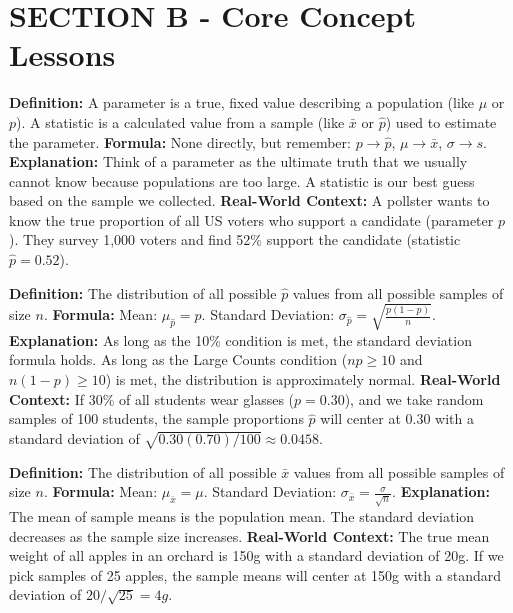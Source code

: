 \section{SECTION B - Core Concept Lessons}

\begin{lessonbox}
\textbf{Definition:} A parameter is a true, fixed value describing a population (like $\mu$ or $p$). A statistic is a calculated value from a sample (like $\bar{x}$ or $\hat{p}$) used to estimate the parameter.
\textbf{Formula:} None directly, but remember: $p \rightarrow \hat{p}$, $\mu \rightarrow \bar{x}$, $\sigma \rightarrow s$.
\textbf{Explanation:} Think of a parameter as the ultimate truth that we usually cannot know because populations are too large. A statistic is our best guess based on the sample we collected. 
\textbf{Real-World Context:} A pollster wants to know the true proportion of all US voters who support a candidate (parameter $p$). They survey 1,000 voters and find 52\% support the candidate (statistic $\hat{p} = 0.52$).
\end{lessonbox}

\begin{lessonbox}
\textbf{Definition:} The distribution of all possible $\hat{p}$ values from all possible samples of size $n$.
\textbf{Formula:} Mean: $\mu_{\hat{p}} = p$. Standard Deviation: $\sigma_{\hat{p}} = \sqrt{\frac{p(1-p)}{n}}$.
\textbf{Explanation:} As long as the 10\% condition is met, the standard deviation formula holds. As long as the Large Counts condition ($np \geq 10$ and $n(1-p) \geq 10$) is met, the distribution is approximately normal.
\textbf{Real-World Context:} If 30\% of all students wear glasses ($p=0.30$), and we take random samples of 100 students, the sample proportions $\hat{p}$ will center at 0.30 with a standard deviation of $\sqrt{0.30(0.70)/100} \approx 0.0458$.
\end{lessonbox}

\begin{lessonbox}
\textbf{Definition:} The distribution of all possible $\bar{x}$ values from all possible samples of size $n$.
\textbf{Formula:} Mean: $\mu_{\bar{x}} = \mu$. Standard Deviation: $\sigma_{\bar{x}} = \frac{\sigma}{\sqrt{n}}$.
\textbf{Explanation:} The mean of sample means is the population mean. The standard deviation decreases as the sample size increases. 
\textbf{Real-World Context:} The true mean weight of all apples in an orchard is 150g with a standard deviation of 20g. If we pick samples of 25 apples, the sample means will center at 150g with a standard deviation of $20/\sqrt{25} = 4g$.
\end{lessonbox}

